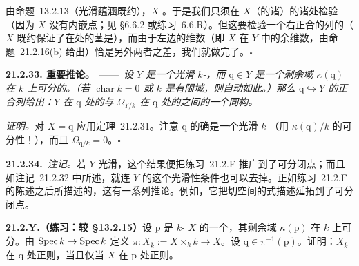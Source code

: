 由\mbox{命题~13.2.13}（光滑蕴涵既约），$X$ \trReduced。于是我们只须在 $X$（的诸\trIrreducibleComponent）的诸\trGenericPoint{}处检验（因为 $X$ 没有内嵌点；见 \S6.6.2 或\mbox{练习~6.6.R}）。但这要检验一个右正合的\trVectorSpace{}列的\trLeftExactness（$X$ 既约保证了在\trGenericPoint{}处的茎是\trVectorSpace），而由于左边的维数（即 $X$ 在 $Y$ 中的余维数，由\mbox{命题~21.2.16(b)} 给出）恰是另外两者之差，我们就做完了。\hfill$\square$

\textbf{21.2.33. 重要推论。}\ ——\ \emph{设 $Y$ 是一个光滑 $k$-\trVariety，而 $\mathrm{q}\in Y$ 是一个剩余域 $\kappa(\mathrm{q})$ 在 $k$ 上可分的\trClosedPoint。（若 $\operatorname{char}k=0$ 或 $k$ 是有限域，则自动如此。）那么 $\mathrm{q}\hookrightarrow Y$ 的\trConormal{}正合列给出：$Y$ 在 $\mathrm{q}$ 处的\trZariski{}\trCotangentSpace{}与 $\Omega_{Y/k}$ 在 $\mathrm{q}$ 处的\trFiber{}之间的一个同构。}

\emph{证明。}\quad 对 $X=\mathrm{q}$ 应用\mbox{定理~21.2.31}。注意 $\mathrm{q}$ 的确是一个光滑 $k$-\trVariety（用 $\kappa(\mathrm{q})/k$ 的可分性！），而且 $\Omega_{\mathrm{q}/k}=0$。\hfill$\square$

\textbf{21.2.34.}\ \emph{注记。}\quad 若 $Y$ 光滑，这个结果便把\mbox{练习~21.2.F} 推广到了可分闭点；而且如\mbox{注记~21.2.32} 中所述，就连 $Y$ 的这个光滑性条件也可以去掉。正如\mbox{练习~21.2.F} 的陈述之后所描述的，这有一系列推论。例如，它把\trZariski{}切空间的\trJacobianMatrix{}式描述延拓到了可分闭点。

\textbf{21.2.Y.（练习：较 \S13.2.15）}\quad 设 $\mathrm{p}$ 是 $k$-\trVariety{} $X$ 的一个\trClosedPoint，其剩余域 $\kappa(\mathrm{p})$ 在 $k$ 上可分。由\trBaseChange{} $\operatorname{Spec}\bar{k}\to\operatorname{Spec} k$ 定义 $\pi\colon X_{\bar{k}}:=X\times_k\bar{k}\to X$。设 $\mathrm{q}\in\pi^{-1}(\mathrm{p})$。证明：$X_{\bar{k}}$ 在 $\mathrm{q}$ 处正则，当且仅当 $X$ 在 $\mathrm{p}$ 处正则。
